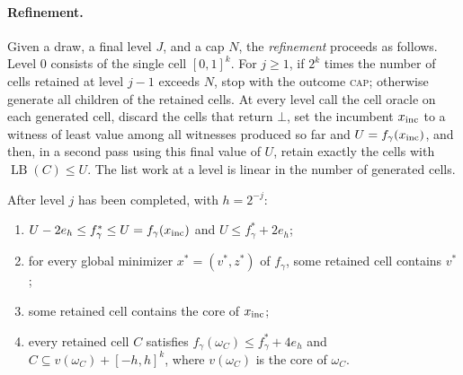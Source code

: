 \paragraph{Refinement.}
Given a draw, a final level $J$, and a cap $N$, the \emph{refinement}
proceeds as follows. Level $0$ consists of the single cell $[0,1]^k$.
For $j\ge1$, if $2^k$ times the number of cells retained at level $j-1$
exceeds $N$, stop with the outcome \textsc{cap}; otherwise generate all
children of the retained cells. At every level call the cell oracle on
each generated cell, discard the cells that return $\bot$, set the
incumbent $x_{\rm inc}$ to a witness of least value among all witnesses
produced so far and $U=f_\gamma(x_{\rm inc})$, and then, in a second
pass using this final value of $U$, retain exactly the cells with
$\operatorname{LB}(C)\le U$. The list work at a level is linear in the
number of generated cells.

\begin{lemma}
\label{lem:recourse-refinement}
After level $j$ has been completed, with $h=2^{-j}$:
\begin{enumerate}[label=(\alph*)]
\item $U-2e_h\le f_\gamma^*\le U=f_\gamma(x_{\rm inc})$ and
$U\le f_\gamma^*+2e_h$;
\item for every global minimizer $x^*=(v^*,z^*)$ of $f_\gamma$, some
retained cell contains $v^*$;
\item some retained cell contains the core of $x_{\rm inc}$;
\item every retained cell $C$ satisfies
$f_\gamma(\omega_C)\le f_\gamma^*+4e_h$ and
$C\subseteq v(\omega_C)+[-h,h]^k$, where $v(\omega_C)$ is the core of
$\omega_C$.
\end{enumerate}
\end{lemma}

